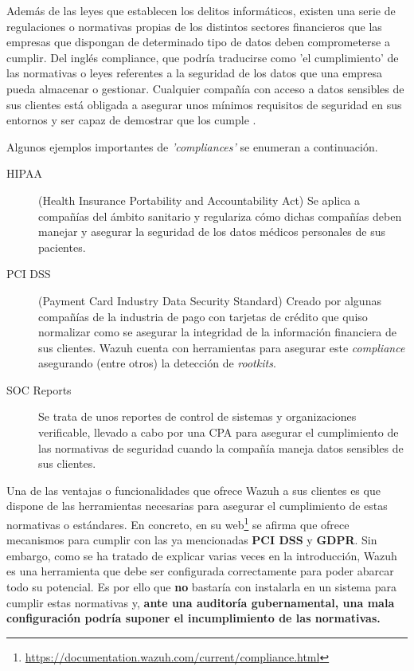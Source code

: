 Además de las leyes que establecen los delitos informáticos, existen una serie de regulaciones o normativas propias de los distintos sectores financieros que las empresas que dispongan de determinado tipo de datos deben comprometerse a cumplir. Del inglés \Gls{compliance}, que podría traducirse como 'el cumplimiento' de las normativas o leyes referentes a la seguridad de los datos que una empresa pueda almacenar o gestionar. Cualquier compañía con acceso a datos sensibles de sus clientes está obligada a asegurar unos mínimos requisitos de seguridad en sus entornos y ser capaz de demostrar que los cumple \cite{phoenixnap}. 

Algunos ejemplos importantes de \textit{'compliances'} se enumeran a continuación.

\begin{description}
\item[HIPAA](Health Insurance Portability and Accountability Act) Se aplica a compañías del ámbito sanitario y regulariza cómo dichas compañías deben manejar y asegurar la seguridad de los datos médicos personales de sus pacientes. 

\item[PCI DSS] (Payment Card Industry Data Security Standard) Creado por algunas compañías de la industria de pago con tarjetas de crédito que quiso normalizar como se asegurar la integridad de la información financiera de sus clientes. Wazuh \cite{wazuh-pci} cuenta con herramientas para asegurar este \textit{compliance} asegurando (entre otros) la detección de \textit{rootkits}.

\item[SOC Reports] Se trata de unos reportes de control de sistemas y organizaciones verificable, llevado a cabo por una \acrfull{CPA} para asegurar el cumplimiento de las normativas de seguridad cuando la compañía maneja datos sensibles de sus clientes.

\end{description}

Una de las ventajas o funcionalidades que ofrece Wazuh a sus clientes es que dispone de las herramientas necesarias para asegurar el cumplimiento de estas normativas o estándares. En concreto, en su web\footnote{\url{https://documentation.wazuh.com/current/compliance.html}} se afirma que ofrece mecanismos para cumplir con las ya mencionadas \textbf{PCI DSS} y \textbf{GDPR}. Sin embargo, como se ha tratado de explicar varias veces en la introducción, Wazuh es una herramienta que debe ser configurada correctamente para poder abarcar todo su potencial. Es por ello que \textbf{no} bastaría con instalarla en un sistema para cumplir estas normativas y, \textbf{ante una auditoría gubernamental, una mala configuración podría suponer el incumplimiento de las normativas.}

